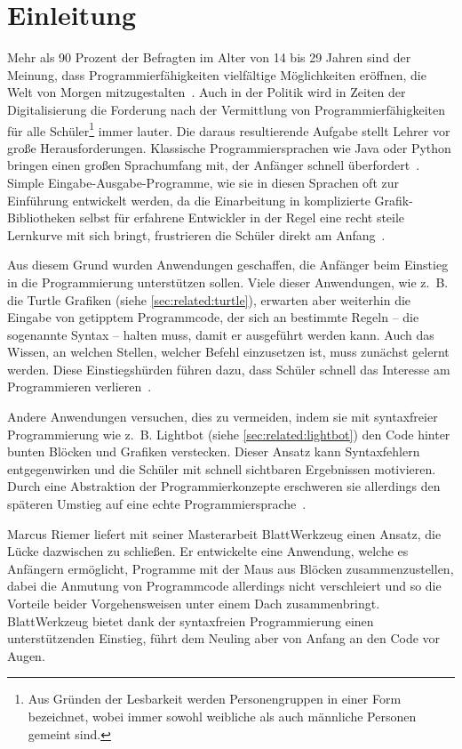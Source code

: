\chapter{Einleitung}
\label{sec:intro}

Mehr als 90 Prozent der Befragten im Alter von 14 bis 29 Jahren sind der Meinung, dass Programmierfähigkeiten vielfältige Möglichkeiten eröffnen, die Welt von Morgen mitzugestalten~\cite{statista-1}. Auch in der Politik wird in Zeiten der Digitalisierung die Forderung nach der Vermittlung von Programmierfähigkeiten für alle Schüler\footnote{Aus Gründen der Lesbarkeit werden Personengruppen in einer Form bezeichnet, wobei immer sowohl weibliche als auch männliche Personen gemeint sind.} immer lauter. Die daraus resultierende Aufgabe stellt Lehrer vor große Herausforderungen. Klassische Programmiersprachen wie Java oder Python bringen einen großen Sprachumfang mit, der Anfänger schnell überfordert~\cite{ko2004}. Simple Ein\-gabe-Aus\-gabe-Pro\-gramme, wie sie in diesen Sprachen oft zur Einführung entwickelt werden, da die Einarbeitung in komplizierte Gra\-fik-Bi\-b\-lio\-theken selbst für erfahrene Entwickler in der Regel eine recht steile Lernkurve mit sich bringt, frustrieren die Schüler direkt am Anfang~\cite[63]{resnick2009}.

Aus diesem Grund wurden Anwendungen geschaffen, die Anfänger beim Einstieg in die Programmierung unterstützen sollen. Viele dieser Anwendungen, wie z.~B. die Turtle Grafiken (siehe \ref{sec:related:turtle}), erwarten aber weiterhin die Eingabe von getipptem Programmcode, der sich an bestimmte Regeln -- die sogenannte Syntax -- halten muss, damit er ausgeführt werden kann. Auch das Wissen, an welchen Stellen, welcher Befehl einzusetzen ist, muss zunächst gelernt werden. Diese Einstiegshürden führen dazu, dass Schüler schnell das Interesse am Programmieren verlieren~\cite{ko2004}.

Andere Anwendungen versuchen, dies zu vermeiden, indem sie mit syntaxfreier Programmierung wie z.~B. Lightbot (siehe \ref{sec:related:lightbot}) den Code hinter bunten Blöcken und Grafiken verstecken. Dieser Ansatz kann Syntaxfehlern entgegenwirken und die Schüler mit schnell sichtbaren Ergebnissen motivieren. Durch eine Abstraktion der Programmierkonzepte erschweren sie allerdings den späteren Umstieg auf eine echte Programmiersprache~\cite{gouws2013}.

Marcus Riemer liefert mit seiner Masterarbeit BlattWerkzeug einen Ansatz, die Lücke dazwischen zu schließen. Er entwickelte eine Anwendung, welche es Anfängern ermöglicht, Programme mit der Maus aus Blöcken zusammenzustellen, dabei die Anmutung von Programmcode allerdings nicht verschleiert und so die Vorteile beider Vorgehensweisen unter einem Dach zusammenbringt. BlattWerkzeug bietet dank der syntaxfreien Programmierung einen unterstützenden Einstieg, führt dem Neuling aber von Anfang an den Code vor Augen.

